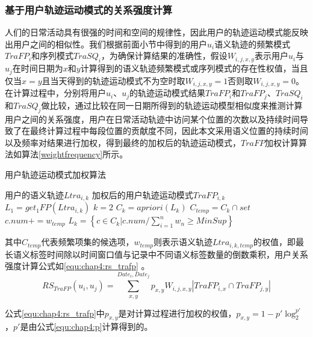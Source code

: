 \subsubsection{基于用户轨迹运动模式的关系强度计算}
人们的日常活动具有很强的时间和空间的规律性，因此用户的轨迹运动模式能反映出用户之间的相似性。我们根据前面小节中得到的用户$u_{i}$语义轨迹的频繁模式$TraFP_{i}$和序列模式$TraSQ_{i}$，为确保计算结果的准确性，假设$W_{i,j,x,y}$表示用户$u_{i}$与$u_{j}$在时间日期为$x$和$y$计算得到的语义轨迹频繁模式或序列模式的存在性权值，当且仅当$x=y$且当天得到的轨迹运动模式不为空时取$W_{i,j,x,y}=1$否则取$W_{i,j,x,y}=0$。在计算过程中，分别将用户$u_{i}$、$u_{j}$的轨迹运动模式结果$TraFP_{i}$和$TraFP_{j}$、$TraSQ_{i}$和$TraSQ_{j}$做比较，通过比较在同一日期所得到的轨迹运动模型相似度来推测计算用户之间的关系强度，用户在日常活动轨迹中访问某个位置的次数以及持续时间导致了在最终计算过程中每段位置的贡献度不同，因此本文采用语义位置的持续时间以及频率对结果进行加权，得到最终的加权后的轨迹运动模式，$TraFP$加权计算算法如算法\ref{weightfrequency}所示。
\begin{algorithm}[H]
    \caption{用户轨迹运动模式加权算法}
    \label{weightfrequency}
    \begin{algorithmic}[1] %
    \REQUIRE 用户的语义轨迹$Ltra_{i,k}$
    \ENSURE 加权后的用户轨迹运动模式$TraFP_{i,k}$
    \STATE $L_{1}= get_{1}FP(Ltra_{i,k})$
    \STATE $k=2$
    \STATE $C_{k}=apriori(L_{k})$
    \STATE $C_{temp}=C_{k}\cap set$
    \STATE $c.num+=w_{temp}$
    \ENDFOR
    \ENDFOR	
    \STATE \mbox{{$L_{k} = \left \{   c\in C_{k}  |  c.num /\sum_{i=1}^{n}w_{n} \geq MinSup  \right \}$ }}
    \ENDWHILE
\end{algorithmic}
\end{algorithm}
\par 其中$C_{temp}$代表频繁项集的候选项，$w_{temp}$则表示语义轨迹$Ltra_{i,k,temp}$的权值，即最长语义标签时间除以时间窗口值与记录中不同语义标签数量的倒数乘积，用户关系强度计算公式如\ref{equ:chap4:rs_trafp} 。
\begin{equation}
\label{equ:chap4:rs_trafp}
RS_{TraFP}(u_{i},u_{j})=\sum_{x ,y }^{ Date_{i}, Date_{j}} p_{x,y} W_{i,j,x,y} \left |TraFP_{i,x} \cap TraFP_{j,y}   \right |
\end{equation}
\par 公式\ref{equ:chap4:rs_trafp}中$p_{x,y}$是对计算过程进行加权的权值，$p_{x,y}=1-{p}'\log_{2}^{{p}'}$，${p}'$是由公式\ref{equ:chap4:p}计算得到的。
